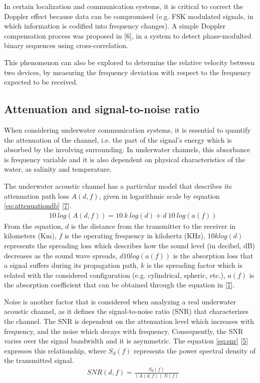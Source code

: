 In certain localization and communication systems, it is critical to correct the Doppler effect because data can be compromised (e.g. FSK modulated signals, in which information is codified into frequency changes). A simple Doppler compensation process  was proposed in [6], in a system to detect phase-modulted binary sequences using cross-correlation.

This phenomenon can also be explored to determine the relative velocity between two devices, by measuring the frequency deviation with respect to the frequency expected to be received.


\subsection{Attenuation and signal-to-noise ratio} \label{subsec:snr}

When considering underwater communication systems, it is essential to quantify the attenuation of the channel, i.e. the part of the signal's energy which is absorbed by the involving surrounding. In underwater channels, this absorbance is frequency variable and it is also dependent on physical characteristics of the water, as salinity and temperature. 

The underwater acoustic channel has a particular model that describes its attenuation path loss \(A(d,f)\), given in logarithmic scale by equation \ref{eq:attenuationdb} [\hyperref[r:pathloss]{7}]. 
\begin{eqnarray}
&10\ log(A(d,f)) = 10\ k\ log(d) + d\ 10\ log(a(f))
\label{eq:attenuationdb}
\end{eqnarray}
From the equation, \(d\) is the distance from the transmitter to the receiver in kilometers (Km), \(f\) is the operating frequency in kilohertz (KHz), \(10klog(d)\) represents the spreading loss which describes how the sound level (in decibel, dB) decreases as the sound wave spreads, \(d10log(a(f))\) is the absorption loss that a signal suffers during its propagation path, \(k\) is the spreading factor which is related with the considered configuration (e.g. cylindrical, spheric, etc.), \(a(f)\) is the absorption coefficient that can be obtained through the equation in [\hyperref[r:pathloss]{7}].

Noise is another factor that is considered when analyzing a real underwater acoustic channel, as it defines the signal-to-noise ratio (SNR) that characterizes the channel. The SNR is dependent on the attenuation level which increases with frequency, and the noise which decays with frequency. Consequently, the SNR varies over the signal bandwidth and it is asymmetric. The equation \ref{eq:snr} [\hyperref[r:commchan]{5}] expresses this relationship, where \(S_{d}(f)\) represents the power spectral density of the transmitted signal.
\begin{eqnarray}
&SNR(d,f) = \frac{S_{d}(f)}{(A(d,f))\ N(f)}
\label{eq:snr}
\end{eqnarray}

